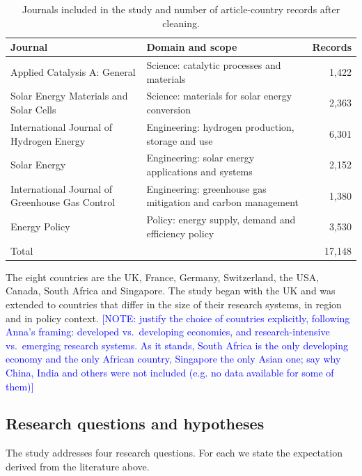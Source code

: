 \documentclass[preprint,12pt,number]{elsarticle}
\newcommand{\note}[1]{\textcolor{blue}{[NOTE: #1]}}
\begin{document}
\begin{table}[htbp]
\centering
\caption{Journals included in the study and number of article-country records after cleaning.}
\label{tab:journals}
\begin{tabular}{p{6.3cm}p{5.2cm}r}
\toprule
Journal & Domain and scope & Records \\
\midrule
Applied Catalysis A: General & Science: catalytic processes and materials & 1,422 \\
Solar Energy Materials and Solar Cells & Science: materials for solar energy conversion & 2,363 \\
International Journal of Hydrogen Energy & Engineering: hydrogen production, storage and use & 6,301 \\
Solar Energy & Engineering: solar energy applications and systems & 2,152 \\
International Journal of Greenhouse Gas Control & Engineering: greenhouse gas mitigation and carbon management & 1,380 \\
Energy Policy & Policy: energy supply, demand and efficiency policy & 3,530 \\
\midrule
Total & & 17,148 \\
\bottomrule
\end{tabular}
\end{table}

The eight countries are the UK, France, Germany, Switzerland, the USA, Canada, South Africa and Singapore. The study began with the UK and was extended to countries that differ in the size of their research systems, in region and in policy context. \note{justify the choice of countries explicitly, following Anna's framing: developed vs.\ developing economies, and research-intensive vs.\ emerging research systems. As it stands, South Africa is the only developing economy and the only African country, Singapore the only Asian one; say why China, India and others were not included (e.g. no data available for some of them)}

\subsection{Research questions and hypotheses}

The study addresses four research questions. For each we state the expectation derived from the literature above.
\end{document}
